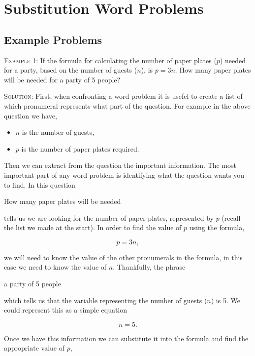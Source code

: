 \documentclass[a4paper,12pt]{article}
\begin{document}
\large
\section*{Substitution Word Problems}

\subsection*{Example Problems}

\textsc{Example 1}: If the formula for calculating the number 
of paper plates ($p$) needed for a party, based on the 
number of guests ($n$), is $p = 3n$. How many paper plates 
will be needed for a party of 5 people?

\textsc{Solution}: First, when confronting a word problem 
it is usefel to create a list of which pronumeral represents
what part of the question. For example in the above question 
we have,

\begin{itemize}
\item $n$ is the number of guests,
\item $p$ is the number of paper plates required.
\end{itemize}

Then we can extract from the question the important
information. The most important part of any word problem
is identifying what the question wants you to find. In this 
question

\begin{displayquote}
How many paper plates will be needed
\end{displayquote}

tells us we are looking for the number of paper plates, 
represented by $p$ (recall the list we made at the start).
In order to find the value of $p$ using the formula,

$$p = 3n,$$

we will need to know the value of the other pronumerals in the 
formula, in this case we need to know the value of $n$. 
Thankfully, the phrase

\begin{displayquote}
a party of 5 people
\end{displayquote}

which tells us that the variable representing the number 
of guests ($n$) is 5. We could represent this as a simple equation

$$n = 5.$$

Once we have this information we can substitute it into 
the formula and find the appropriate value of $p$,
\end{document}
